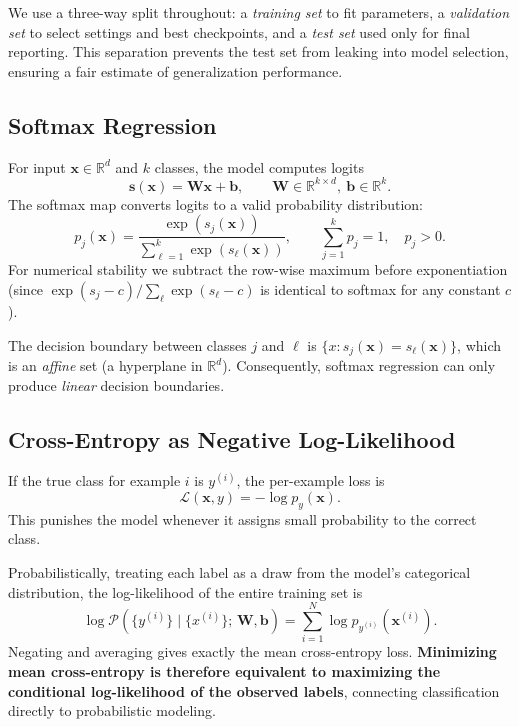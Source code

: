 \documentclass[11pt]{article}
\newcommand{\R}{\mathbb{R}}
\newcommand{\loss}{\mathcal{L}}
\newcommand{\vx}{\mathbf{x}}
\newcommand{\vs}{\mathbf{s}}
\newcommand{\vb}{\mathbf{b}}
\newcommand{\mW}{\mathbf{W}}
\begin{document}
We use a three-way split throughout: a \emph{training set} to fit parameters, a
\emph{validation set} to select settings and best checkpoints, and a \emph{test set}
used only for final reporting.
This separation prevents the test set from leaking into model selection, ensuring a
fair estimate of generalization performance.

\subsection{Softmax Regression}

For input $\vx \in \R^d$ and $k$ classes, the model computes logits
\begin{equation}
    \vs(\vx) = \mW\vx + \vb, \qquad \mW \in \R^{k \times d},\ \vb \in \R^k.
\end{equation}
The softmax map converts logits to a valid probability distribution:
\begin{equation}
    p_j(\vx) = \frac{\exp(s_j(\vx))}{\displaystyle\sum_{\ell=1}^{k} \exp(s_\ell(\vx))},
    \qquad \sum_{j=1}^k p_j = 1,\quad p_j > 0.
\end{equation}
For numerical stability we subtract the row-wise maximum before exponentiation (since
$\exp(s_j - c)/\sum_\ell \exp(s_\ell - c)$ is identical to softmax for any constant $c$).

The decision boundary between classes $j$ and $\ell$ is
$\{x : s_j(\vx) = s_\ell(\vx)\}$, which is an \emph{affine} set (a hyperplane in $\R^d$).
Consequently, softmax regression can only produce \emph{linear} decision boundaries.

\subsection{Cross-Entropy as Negative Log-Likelihood}

If the true class for example $i$ is $y^{(i)}$, the per-example loss is
\begin{equation}
    \loss(\vx, y) = -\log p_y(\vx).
\end{equation}
This punishes the model whenever it assigns small probability to the correct class.

Probabilistically, treating each label as a draw from the model's categorical distribution,
the log-likelihood of the entire training set is
\begin{equation}
    \log \mathcal{P}(\{y^{(i)}\} \mid \{x^{(i)}\};\, \mW, \vb)
    = \sum_{i=1}^N \log p_{y^{(i)}}(\vx^{(i)}).
\end{equation}
Negating and averaging gives exactly the mean cross-entropy loss.
\textbf{Minimizing mean cross-entropy is therefore equivalent to maximizing the
conditional log-likelihood of the observed labels}, connecting classification directly
to probabilistic modeling.
\end{document}
